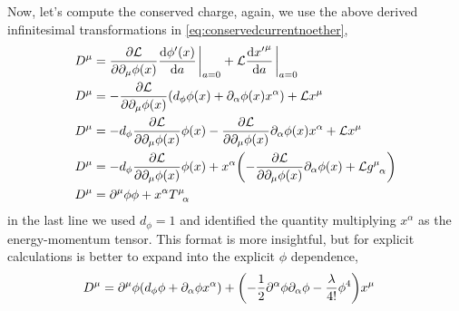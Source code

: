 Now, let's compute the conserved charge, again, we use the above derived infinitesimal transformations in \cref{eq:conservedcurrentnoether},
\begin{align}
    D^\mu &=\pdv{\mathcal L}{\partial_\mu\phi\qty(x)}\dv{\phi'\qty(x)}{a}\eval_{a=0}+\mathcal L\dv{{x'}^\mu}{a}\eval_{a=0}\\
    D^\mu &=-\pdv{\mathcal L}{\partial_\mu\phi\qty(x)}\qty(d_\phi\phi\qty(x) +\partial_\alpha\phi\qty(x)x^\alpha)+\mathcal Lx^\mu\\
    D^\mu &=-d_\phi\pdv{\mathcal L}{\partial_\mu\phi\qty(x)}\phi\qty(x)-\pdv{\mathcal L}{\partial_\mu\phi\qty(x)}\partial_\alpha\phi\qty(x)x^\alpha+\mathcal Lx^\mu\\
    D^\mu &=-d_\phi\pdv{\mathcal L}{\partial_\mu\phi\qty(x)}\phi\qty(x)+x^\alpha\qty(-\pdv{\mathcal L}{\partial_\mu\phi\qty(x)}\partial_\alpha\phi\qty(x)+\mathcal L\tensor{g}{^\mu_\alpha})\\
    D^\mu &=\partial^\mu\phi\phi+x^\alpha\tensor{T}{^\mu_\alpha}\label{eq:dilatoncurrentunimproved}
\end{align}
in the last line we used $d_\phi=1$ and identified the quantity multiplying $x^\alpha$ as the energy-momentum tensor. This format is more insightful, but for explicit 
calculations is better to expand into the explicit $\phi$ dependence,
\begin{align}
    D^\mu &=\partial^\mu \phi\qty(d_\phi\phi +\partial_\alpha\phi x^\alpha)+\qty(-\frac12\partial^\alpha\phi\partial_\alpha\phi-\frac{\lambda}{4!}\phi^4)x^\mu
\end{align}

